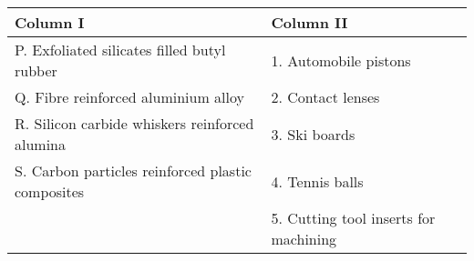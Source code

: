 \begin{tabular}{| p{6.5cm} | p{5cm} |}
\hline
\textbf{Column I} & \textbf{Column II} \\
\hline
P. Exfoliated silicates filled butyl rubber & 1. Automobile pistons \\
\hline
Q. Fibre reinforced aluminium alloy & 2. Contact lenses \\
\hline
R. Silicon carbide whiskers reinforced alumina & 3. Ski boards \\
\hline
S. Carbon particles reinforced plastic composites & 4. Tennis balls \\
\hline
& 5. Cutting tool inserts for machining \\
\hline
\end{tabular}
